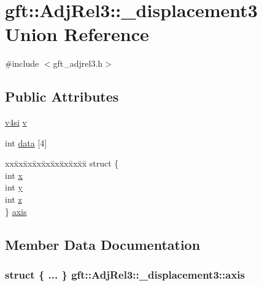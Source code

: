 \hypertarget{uniongft_1_1AdjRel3_1_1__displacement3}{}\section{gft\+:\+:Adj\+Rel3\+:\+:\+\_\+displacement3 Union Reference}
\label{uniongft_1_1AdjRel3_1_1__displacement3}


{\ttfamily \#include $<$gft\+\_\+adjrel3.\+h$>$}

\subsection*{Public Attributes}
\begin{DoxyCompactItemize}
\item 
\hyperlink{namespacegft_aba3889d81ba015326f093206316745b7}{v4si} \hyperlink{uniongft_1_1AdjRel3_1_1__displacement3_a091c5a31d9f9bd6d2bb83ef162862b24}{v}
\item 
int \hyperlink{uniongft_1_1AdjRel3_1_1__displacement3_a5509be46ba4287a876051921eeff490d}{data} \mbox{[}4\mbox{]}
\item 
\begin{tabbing}
xx\=xx\=xx\=xx\=xx\=xx\=xx\=xx\=xx\=\kill
struct \{\\
\>int \hyperlink{uniongft_1_1AdjRel3_1_1__displacement3_a4fa741e907bc8e74a7cc4286f9db7b19}{x}\\
\>int \hyperlink{uniongft_1_1AdjRel3_1_1__displacement3_a5ebb63d19d067fb232fd980c28a8c465}{y}\\
\>int \hyperlink{uniongft_1_1AdjRel3_1_1__displacement3_ac047739172cb413ef913e594f09170c3}{z}\\
\} \hyperlink{uniongft_1_1AdjRel3_1_1__displacement3_a3aa860b5645b4772e2501cf74396ad08}{axis}\\

\end{tabbing}\end{DoxyCompactItemize}


\subsection{Member Data Documentation}
\subsubsection[{\texorpdfstring{axis}{axis}}]{\setlength{\rightskip}{0pt plus 5cm}struct \{ ... \}   gft\+::\+Adj\+Rel3\+::\+\_\+displacement3\+::axis}\hypertarget{uniongft_1_1AdjRel3_1_1__displacement3_a3aa860b5645b4772e2501cf74396ad08}{}\label{uniongft_1_1AdjRel3_1_1__displacement3_a3aa860b5645b4772e2501cf74396ad08}
